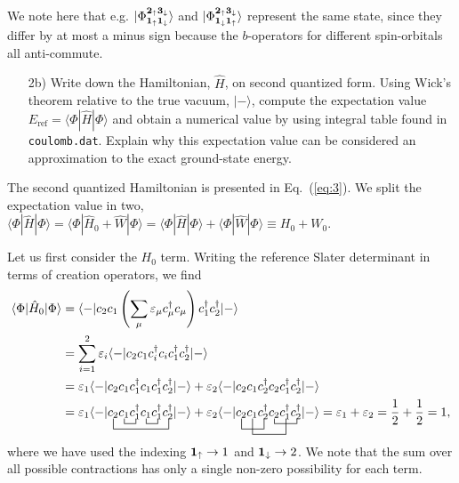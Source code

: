 \documentclass[a4paper]{article}
\newcommand{\eq} [1]{Eq.\ (\ref{eq:#1})}
\newcommand{\nn}{\nonumber}
\renewcommand{\u}[1]{{\bf #1}_\uparrow}
\renewcommand{\d}[1]{{\bf #1}_\downarrow}
\begin{document}
We note here that e.g. $|\Phi^{\u{2}\d{3}}_{\u{1}\d{1}}\rangle$ and $|\Phi^{\u{2}\d{3}}_{\d{1}\u{1}}\rangle$ represent the same state, since they differ by at most a minus sign because the $b$-operators for different spin-orbitals all anti-commute.

\begin{exframe}
\begin{itemize}
  \item[2b)] Write down the Hamiltonian, $\hat{H}$, on second quantized form. Using Wick's theorem relative to the true vacuum, $|-\rangle$, compute the expectation value $E_\text{ref}=\langle \Phi |\hat{H} | \Phi\rangle$ and obtain a numerical value by using integral table found in \texttt{coulomb.dat}. Explain why this expectation value can be considered an approximation to the exact ground-state energy. 
\end{itemize}
\end{exframe}
The second quantized Hamiltonian is presented in \eq{3}. We split the expectation value in two, $\langle \Phi |\hat{H} | \Phi\rangle=\langle \Phi |\hat{H}_0 +\hat{W} | \Phi\rangle = \langle \Phi |\hat{H} | \Phi\rangle + \langle \Phi |\hat{W} | \Phi\rangle \equiv H_0+W_0$. 

Let us first consider the $H_0$ term. Writing the reference Slater determinant in terms of creation operators, we find
\begin{align}
\langle \Phi | \hat{H}_0 | \Phi \rangle &= \langle-| c_2c_1  \left(\sum_\mu \varepsilon_\mu c_\mu^\dagger c_\mu\right)  c_1^\dagger c_2^\dagger |-\rangle \nn\\
                                        &= \sum_{i=1}^2 \varepsilon_i \langle-| c_2c_1  c_i^\dagger c_i  c_1^\dagger c_2^\dagger |-\rangle \nn\\
                                        &= \varepsilon_1 \langle-| c_2c_1  c_1^\dagger c_1  c_1^\dagger c_2^\dagger |-\rangle + \varepsilon_2 \langle-| c_2c_1  c_2^\dagger c_2  c_1^\dagger c_2^\dagger |-\rangle \nn\\
                                        &= \varepsilon_1 \langle-| \bcontraction[2ex]{}{c_2}{c_1c_1^\dagger c_1c_1^\dagger}{c_2^\dagger}\bcontraction{c_2}{c_1}{}{c_1^\dagger}\bcontraction{c_2c_1c_1^\dagger}{c_1}{}{c_1^\dagger}c_2c_1c_1^\dagger c_1c_1^\dagger c_2^\dagger |-\rangle + \varepsilon_2 \langle-|\bcontraction[2ex]{}{c_2}{c_1}{c_2^\dagger}\bcontraction[3ex]{c_2}{c_1}{c_2^\dagger c_2}{c_1^\dagger}\bcontraction{c_2c_1c_2^\dagger}{c_2}{c_1^\dagger}{c_2^\dagger} c_2c_1c_2^\dagger c_2c_1^\dagger c_2^\dagger |-\rangle = \varepsilon_1+\varepsilon_2 = \frac{1}{2}+\frac{1}{2} = 1, \label{eq:4}
\end{align}
where we have used the indexing $\u{1}\rightarrow 1$ and $\d{1}\rightarrow 2$. We note that the sum over all possible contractions has only a single non-zero possibility for each term.
\end{document}

